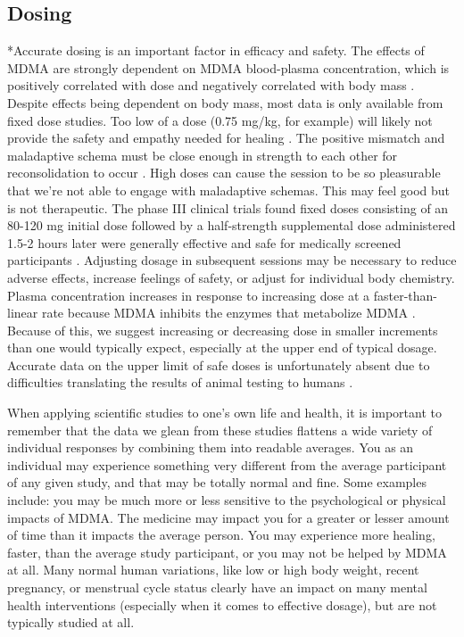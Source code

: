 \documentclass[12pt,letterpaper]{article}
\begin{document}
\subsection{Dosing}
\label{sec:dosing}
*Accurate dosing is an important factor in efficacy and safety. The effects of MDMA are strongly dependent on MDMA blood-plasma concentration, which is positively correlated with dose and negatively correlated with body mass \cite{studerusResponse}. Despite effects being dependent on body mass, most data is only available from fixed dose studies. Too low of a dose (0.75 mg/kg, for example) will likely not provide the safety and empathy needed for healing \cite{bediMDMALowDose}. The positive mismatch and maladaptive schema must be close enough in strength to each other for reconsolidation to occur \cite{eckerUnlocking}. High doses can cause the session to be so pleasurable that we're not able to engage with maladaptive schemas. This may feel good but is not therapeutic. The phase III clinical trials found fixed doses consisting of an 80-120 mg initial dose followed by a half-strength supplemental dose administered 1.5-2 hours later were generally effective and safe for medically screened participants \cite{mitchellMDMAClinicalTrial2}. Adjusting dosage in subsequent sessions may be necessary to reduce adverse effects, increase feelings of safety, or adjust for individual body chemistry. Plasma concentration increases in response to increasing dose at a faster-than-linear rate because MDMA inhibits the enzymes that metabolize MDMA \cite{de2000nonlinear}. Because of this, we suggest increasing or decreasing dose in smaller increments than one would typically expect, especially at the upper end of typical dosage. Accurate data on the upper limit of safe doses is unfortunately absent due to difficulties translating the results of animal testing to humans \cite{passieHistory}.

When applying scientific studies to one's own life and health, it is important to remember that the data we glean from these studies flattens a wide variety of individual responses by combining them into readable averages. You as an individual may experience something very different from the average participant of any given study, and that may be totally normal and fine. Some examples include: you may be much more or less sensitive to the psychological or physical impacts of MDMA. The medicine may impact you for a greater or lesser amount of time than it impacts the average person. You may experience more healing, faster, than the average study participant, or you may not be helped by MDMA at all.  Many normal human variations, like low or high body weight, recent pregnancy, or menstrual cycle status clearly have an impact on many mental health interventions (especially when it comes to effective dosage), but are not typically studied at all.
\end{document}
